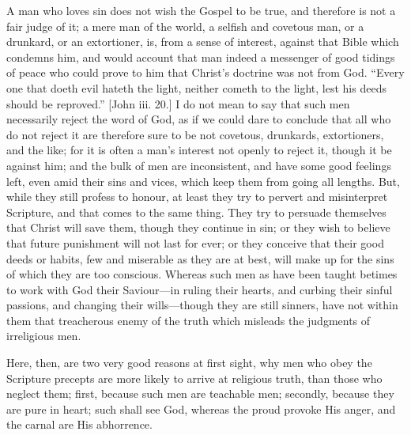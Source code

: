 A man who loves sin does not wish the Gospel to be true, and
therefore is not a fair judge of it; a mere man of the world, a
selfish and covetous man, or a drunkard, or an extortioner, is, from a
sense of interest, against that Bible which condemns him, and would
account that man indeed a messenger of good tidings of peace who could
prove to him that Christ's doctrine was not from God. ``Every one
that doeth evil hateth the light, neither cometh to the light, lest
his deeds should be reproved.'' [John iii. 20.] I do not mean to
say that such men necessarily reject the word of God, as if we could
dare to conclude that all who do not reject it are therefore sure to
be not covetous, drunkards, extortioners, and the like; for it is
often a man's interest not openly to reject it, though it be against
him; and the bulk of men are inconsistent, and have some good feelings
left, even amid their sins and vices, which keep them from going all
lengths. But, while they still profess to honour, at least they try to
pervert and misinterpret Scripture, and that comes to the same thing.
They try to persuade themselves that Christ will save them, though
they continue in sin; or they wish to believe that future punishment
will not last for ever; or they conceive that their good deeds or
habits, few and miserable as they are at best, will make up for the
sins of which they are too conscious. Whereas such men as have been
taught betimes to work with God their Saviour—in ruling their
hearts, and curbing their sinful passions, and changing their wills—though
they are still sinners, have not within them that treacherous enemy of
the truth which misleads the judgments of irreligious men.

Here, then, are two very good reasons at first sight, why men who
obey the Scripture precepts are more likely to arrive at religious
truth, than those who neglect them; first, because such men are
teachable men; secondly, because they are pure in heart; such shall
see God, whereas the proud provoke His anger, and the carnal are His
abhorrence.


